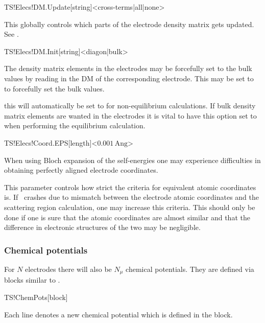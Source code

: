 \begin{fdfentry}{TS!Elecs!DM.Update}[string]<cross-terms|all|none>

  This globally controls which parts of the electrode density matrix
  gets updated. 
  See .
  
\end{fdfentry}

\begin{fdfentry}{TS!Elecs!DM.Init}[string]<diagon|bulk>

  The density matrix elements in the electrodes may be forcefully set
  to the bulk values by reading in the DM of the corresponding
  electrode. This may be set to  to forcefully set the bulk
  values.

  \note this will automatically be set to  for
  non-equilibrium calculations. If bulk density matrix elements are
  wanted in the electrodes it is vital to have this option set to
   when performing the equilibrium calculation.
  
\end{fdfentry}

\begin{fdfentry}{TS!Elecs!Coord.EPS}[length]<$0.001\,\mathrm{Ang}$>

  When using Bloch expansion of the self-energies one may experience
  difficulties in obtaining perfectly aligned electrode coordinates.

  This parameter controls how strict the criteria for equivalent
  atomic coordinates is. If \tsiesta\ crashes due to mismatch between
  the electrode atomic coordinates and the scattering region
  calculation, one may increase this criteria. This should only be
  done if one is sure that the atomic coordinates are almost similar
  and that the difference in electronic structures of the two may be
  negligible.
  
\end{fdfentry}


\subsubsection{Chemical potentials}
\label{sec:ts:chem-pot}

For $N$ electrodes there will also be $N_\mu$ chemical
potentials. They are defined via blocks similar to .

\begin{fdfentry}{TS!ChemPots}[block]
  
  Each line denotes a new chemical potential which is defined in the
   block.
  
\end{fdfentry}

